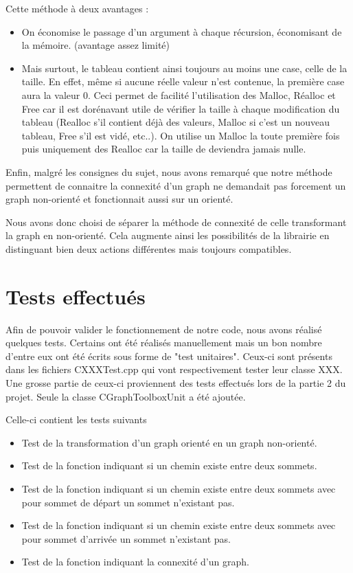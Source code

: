 		Cette méthode à deux avantages :
		\begin{itemize}
			\item On économise le passage d'un argument à chaque récursion, économisant de la mémoire. (avantage assez limité)
			\item Mais surtout, le tableau contient ainsi toujours au moins une case, celle de la taille. En effet, même si aucune réelle valeur n'est contenue, la première case aura la valeur 0. Ceci permet de facilité l'utilisation des Malloc, Réalloc et Free car il est dorénavant utile de vérifier la taille à chaque modification du tableau (Realloc s'il contient déjà des valeurs, Malloc si c'est un nouveau tableau, Free s'il est vidé, etc..). On utilise un Malloc la toute première fois puis uniquement des Realloc car la taille de deviendra jamais nulle.\\
		\end{itemize}
		
		Enfin, malgré les consignes du sujet, nous avons remarqué que notre méthode permettent de connaitre la connexité d'un graph ne demandait pas forcement un graph non-orienté et fonctionnait aussi sur un orienté.
		
		Nous avons donc choisi de séparer la méthode de connexité de celle transformant la graph en non-orienté. Cela augmente ainsi les possibilités de la librairie en distinguant bien deux actions différentes mais toujours compatibles.
		
	\chapter{Tests effectués}
		Afin de pouvoir valider le fonctionnement de notre code, nous avons réalisé quelques tests. Certains ont été réalisés manuellement mais un bon nombre d'entre eux ont été écrits sous forme de "test unitaires". Ceux-ci sont présents dans les fichiers CXXXTest.cpp qui vont respectivement tester leur classe XXX. Une grosse partie de ceux-ci proviennent des tests effectués lors de la partie 2 du projet. Seule la classe CGraphToolboxUnit a été ajoutée.
		
		Celle-ci contient les tests suivants
		\begin{itemize}
			\item Test de la transformation d'un graph orienté en un graph non-orienté.
			\item Test de la fonction indiquant si un chemin existe entre deux sommets.
			\item Test de la fonction indiquant si un chemin existe entre deux sommets avec pour sommet de départ un sommet n'existant pas.
			\item Test de la fonction indiquant si un chemin existe entre deux sommets avec pour sommet d'arrivée un sommet n'existant pas.
			\item Test de la fonction indiquant la connexité d'un graph.
		\end{itemize}
		
